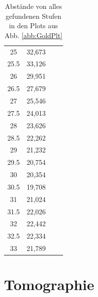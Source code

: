 \begin{table}[h]
\begin{center}
\begin{tabular}[central]{ c  c  | c  c}
25	&	32,673	\\
25.5	&	33,126	\\
26	&	29,951	\\
26.5	&	27,679	\\
27	&	25,546	\\
27.5	&	24,013	\\
28	&	23,626	\\
28.5	&	22,262	\\
29	&	21,232	\\
29.5	&	20,754	\\
30	&	20,354	\\
30.5	&	19,708	\\
31	&	21,024	\\
31.5	&	22,026	\\
32	&	22,442	\\
32.5	&	22,334	\\
33	&	21,789	\\


\end{tabular}
\caption{Abstände von alles gefundenen Stufen in den Plots aus Abb. \ref{abb:GoldPlt}}
\label{tab:wenner}
\end{center}
\end{table}


\section{Tomographie}

